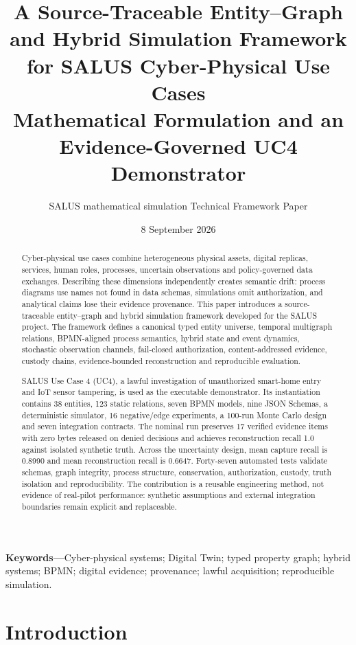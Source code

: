 ﻿\documentclass[10pt,a4paper,twocolumn]{article}
\title{\vspace{-10mm}\textbf{A Source-Traceable Entity--Graph and Hybrid Simulation Framework for SALUS Cyber-Physical Use Cases}\\[1mm]
\large Mathematical Formulation and an Evidence-Governed UC4 Demonstrator}
\author{SALUS mathematical simulation Technical Framework Paper}
\date{8 September 2026}
\begin{document}
\maketitle

\begin{abstract}
Cyber-physical use cases combine heterogeneous physical assets, digital replicas, services, human roles, processes, uncertain observations and policy-governed data exchanges. Describing these dimensions independently creates semantic drift: process diagrams use names not found in data schemas, simulations omit authorization, and analytical claims lose their evidence provenance. This paper introduces a source-traceable entity--graph and hybrid simulation framework developed for the SALUS project. The framework defines a canonical typed entity universe, temporal multigraph relations, BPMN-aligned process semantics, hybrid state and event dynamics, stochastic observation channels, fail-closed authorization, content-addressed evidence, custody chains, evidence-bounded reconstruction and reproducible evaluation.

SALUS Use Case 4 (UC4), a lawful investigation of unauthorized smart-home entry and IoT sensor tampering, is used as the executable demonstrator. Its instantiation contains 38 entities, 123 static relations, seven BPMN models, nine JSON Schemas, a deterministic simulator, 16 negative/edge experiments, a 100-run Monte Carlo design and seven integration contracts. The nominal run preserves 17 verified evidence items with zero bytes released on denied decisions and achieves reconstruction recall 1.0 against isolated synthetic truth. Across the uncertainty design, mean capture recall is 0.8990 and mean reconstruction recall is 0.6647. Forty-seven automated tests validate schemas, graph integrity, process structure, conservation, authorization, custody, truth isolation and reproducibility. The contribution is a reusable engineering method, not evidence of real-pilot performance: synthetic assumptions and external integration boundaries remain explicit and replaceable.
\end{abstract}

\textbf{Keywords---}Cyber-physical systems; Digital Twin; typed property graph; hybrid systems; BPMN; digital evidence; provenance; lawful acquisition; reproducible simulation.

\section{Introduction}
\end{document}
